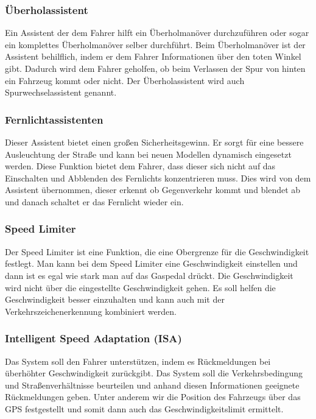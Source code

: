         \subsubsection{Überholassistent}
        Ein Assistent der dem Fahrer hilft ein Überholmanöver durchzuführen oder sogar ein
        komplettes Überholmanöver selber durchführt. Beim Überholmanöver ist der Assistent 
        behilflich, indem er dem Fahrer Informationen über den toten Winkel gibt. Dadurch 
        wird dem Fahrer geholfen, ob beim Verlassen der Spur von hinten ein Fahrzeug kommt 
        oder nicht. Der Überholassistent wird auch Spurwechselassistent genannt.
        ~\cite{ueberholassi.PB1} ~\cite{spurwechsel.PB1} ~\cite{assistenzsysteme.PB1} 
        ~\cite{assistenzsysteme.PB2}
        
        \subsubsection{Fernlichtassistenten}
        Dieser Assistent bietet einen großen Sicherheitsgewinn. Er sorgt für eine bessere
        Ausleuchtung der Straße und kann bei neuen Modellen dynamisch eingesetzt werden.
        Diese Funktion bietet dem Fahrer, dass dieser sich nicht auf das Einschalten und
        Abblenden des Fernlichts konzentrieren muss. Dies wird von dem Assistent übernommen,
        dieser erkennt ob Gegenverkehr kommt und blendet ab und danach schaltet er das Fernlicht
        wieder ein.
        ~\cite{assistenzsysteme.PB2} ~\cite{Audi.PB1}

        \subsubsection{Speed Limiter}
        Der Speed Limiter ist eine Funktion, die eine Obergrenze für die Geschwindigkeit festlegt.
        Man kann bei dem Speed Limiter eine Geschwindigkeit einstellen 
        und dann ist es egal wie stark man auf das Gaspedal drückt. Die Geschwindigkeit wird nicht 
        über die eingestellte Geschwindigkeit gehen. Es soll helfen die Geschwindigkeit besser 
        einzuhalten und kann auch mit der Verkehrszeichenerkennung kombiniert werden.
        ~\cite{assistenzsysteme.PB2} ~\cite{assistenzsysteme.PB2} 

        \subsubsection{Intelligent Speed Adaptation (ISA)}
        Das System soll den Fahrer unterstützen, indem es Rückmeldungen bei überhöhter Geschwindigkeit
        zurückgibt. Das System soll die Verkehrsbedingung und Straßenverhältnisse beurteilen und
        anhand diesen Informationen geeignete Rückmeldungen geben. Unter anderem wir die Position des 
        Fahrzeugs über das GPS festgestellt und somit dann auch das Geschwindigkeitslimit ermittelt.
        ~\cite{ISA.PB1}  ~\cite{speedlimiter.PB1} ~\cite{ISA.PB2}

